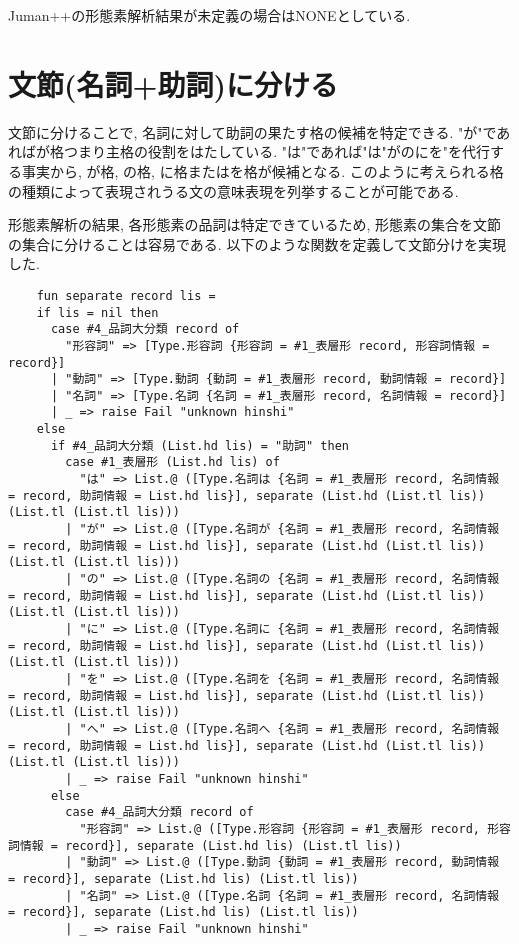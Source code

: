 \documentclass{jreport}
\begin{document}
Juman++の形態素解析結果が未定義の場合はNONEとしている.

\section{文節(名詞+助詞)に分ける}
文節に分けることで, 名詞に対して助詞の果たす格の候補を特定できる.
"が"であればが格つまり主格の役割をはたしている.
"は"であれば"は"がのにを"を代行する事実から, が格, の格, に格またはを格が候補となる.
このように考えられる格の種類によって表現されうる文の意味表現を列挙することが可能である.

形態素解析の結果, 各形態素の品詞は特定できているため, 形態素の集合を文節の集合に分けることは容易である.
以下のような関数を定義して文節分けを実現した.

\begin{verbatim}
    fun separate record lis = 
    if lis = nil then
      case #4_品詞大分類 record of
        "形容詞" => [Type.形容詞 {形容詞 = #1_表層形 record, 形容詞情報 = record}]
      | "動詞" => [Type.動詞 {動詞 = #1_表層形 record, 動詞情報 = record}]
      | "名詞" => [Type.名詞 {名詞 = #1_表層形 record, 名詞情報 = record}]
      | _ => raise Fail "unknown hinshi"
    else
      if #4_品詞大分類 (List.hd lis) = "助詞" then
        case #1_表層形 (List.hd lis) of
          "は" => List.@ ([Type.名詞は {名詞 = #1_表層形 record, 名詞情報 = record, 助詞情報 = List.hd lis}], separate (List.hd (List.tl lis)) (List.tl (List.tl lis)))
        | "が" => List.@ ([Type.名詞が {名詞 = #1_表層形 record, 名詞情報 = record, 助詞情報 = List.hd lis}], separate (List.hd (List.tl lis)) (List.tl (List.tl lis)))
        | "の" => List.@ ([Type.名詞の {名詞 = #1_表層形 record, 名詞情報 = record, 助詞情報 = List.hd lis}], separate (List.hd (List.tl lis)) (List.tl (List.tl lis)))
        | "に" => List.@ ([Type.名詞に {名詞 = #1_表層形 record, 名詞情報 = record, 助詞情報 = List.hd lis}], separate (List.hd (List.tl lis)) (List.tl (List.tl lis)))
        | "を" => List.@ ([Type.名詞を {名詞 = #1_表層形 record, 名詞情報 = record, 助詞情報 = List.hd lis}], separate (List.hd (List.tl lis)) (List.tl (List.tl lis)))
        | "へ" => List.@ ([Type.名詞へ {名詞 = #1_表層形 record, 名詞情報 = record, 助詞情報 = List.hd lis}], separate (List.hd (List.tl lis)) (List.tl (List.tl lis)))
        | _ => raise Fail "unknown hinshi"
      else
        case #4_品詞大分類 record of
          "形容詞" => List.@ ([Type.形容詞 {形容詞 = #1_表層形 record, 形容詞情報 = record}], separate (List.hd lis) (List.tl lis))
        | "動詞" => List.@ ([Type.動詞 {動詞 = #1_表層形 record, 動詞情報 = record}], separate (List.hd lis) (List.tl lis))
        | "名詞" => List.@ ([Type.名詞 {名詞 = #1_表層形 record, 名詞情報 = record}], separate (List.hd lis) (List.tl lis))
        | _ => raise Fail "unknown hinshi"
\end{verbatim}
\end{document}

